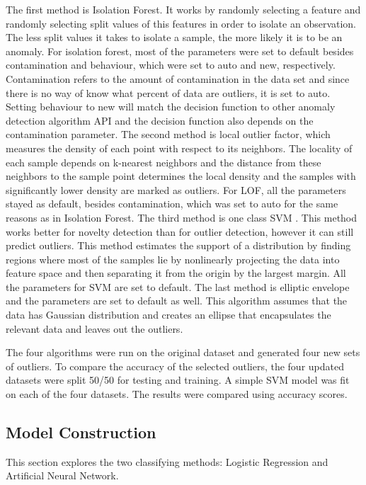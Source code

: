 \documentclass[letterpaper, 12 pt, conference]{ieeeconf}  %
\begin{document}
The first method is Isolation Forest. It works by randomly selecting a feature and randomly selecting split values of this features in order to isolate an observation. The less split values it takes to isolate a sample, the more likely it is to be an anomaly. For isolation forest, most of the parameters were set to default besides contamination and  behaviour, which were set to auto and new, respectively. Contamination refers to the amount of contamination in the data set and since there is no way of know what percent of data are outliers, it is set to auto. Setting behaviour to new will match the decision function to other anomaly detection algorithm API and the decision function also depends on the contamination parameter. The second method is local outlier factor, which measures the density of each point with respect to its neighbors. The locality of each sample depends on k-nearest neighbors and the distance from these neighbors to the sample point determines the local density and the samples with significantly lower density are marked as outliers. For LOF, all the parameters stayed as default, besides contamination, which was set to auto for the same reasons as in Isolation Forest. The third method is one class SVM \cite{Dreiseitl}. This method works better for novelty detection than for outlier detection, however it can still predict outliers. This method estimates the support of a distribution by finding regions where most of the samples lie by nonlinearly projecting the data into feature space and then separating it from the origin by the largest margin. All the parameters for SVM are set to default. The last method is elliptic envelope and the parameters are set to default as well. This algorithm assumes that the data has Gaussian distribution and creates an ellipse that encapsulates the relevant data and leaves out the outliers.
        
The four algorithms were run on the original dataset and generated four new sets of outliers. To compare the accuracy of the selected outliers, the four updated datasets were split 50/50 for testing and training. A simple SVM model was fit on each of the four datasets. The results were compared using accuracy scores. 

\subsection{Model Construction}

This section explores the two classifying methods: Logistic Regression and Artificial Neural Network.
\end{document}

